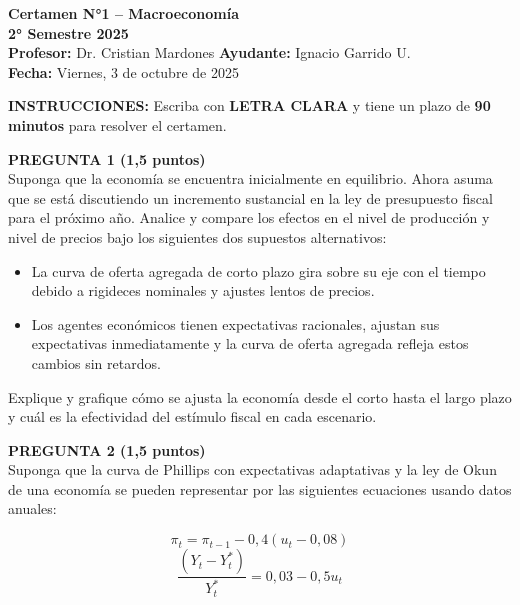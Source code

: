 \documentclass[11pt,addpoints]{article}
\begin{document}
\vspace*{0.1cm}

\begin{center}
{\Large \bfseries Certamen N°1 – Macroeconomía \\[0.25cm]}
\textbf{2° Semestre 2025}\\[0.3cm]
\textbf{Profesor:} Dr. Cristian Mardones \textbf{Ayudante:} Ignacio Garrido U.\\[0.2cm]
\textbf{Fecha:} Viernes, 3 de octubre de 2025
\end{center}

\vspace{0.4cm}
\textbf{INSTRUCCIONES:} Escriba con \textbf{LETRA CLARA} y tiene un plazo de \textbf{90 minutos} para resolver el certamen.

\vspace{0.6cm}

\textbf{PREGUNTA 1 (1,5 puntos)}\\[0.3cm]
Suponga que la economía se encuentra inicialmente en equilibrio. Ahora asuma que se está discutiendo un incremento sustancial en la ley de presupuesto fiscal para el próximo año. Analice y compare los efectos en el nivel de producción y nivel de precios bajo los siguientes dos supuestos alternativos:

\begin{itemize}
  \item La curva de oferta agregada de corto plazo gira sobre su eje con el tiempo debido a rigideces nominales y ajustes lentos de precios.
  \item Los agentes económicos tienen expectativas racionales, ajustan sus expectativas inmediatamente y la curva de oferta agregada refleja estos cambios sin retardos.
\end{itemize}

Explique y grafique cómo se ajusta la economía desde el corto hasta el largo plazo y cuál es la efectividad del estímulo fiscal en cada escenario.

\vspace{0.8cm}

\textbf{PREGUNTA 2 (1,5 puntos)}\\[0.3cm]
Suponga que la curva de Phillips con expectativas adaptativas y la ley de Okun de una economía se pueden representar por las siguientes ecuaciones usando datos anuales:

\[
\pi_t = \pi_{t-1} - 0{,}4(u_t - 0{,}08)
\]
\[
\frac{(Y_t - Y_t^*)}{Y_t^*} = 0{,}03 - 0{,}5u_t
\]
\end{document}
